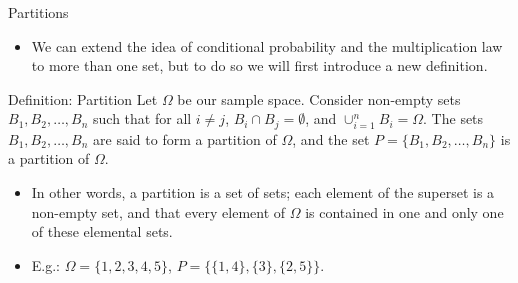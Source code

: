 \begin{frame}{Partitions}

  \begin{itemize}
    \item We can extend the idea of conditional probability and the multiplication law to more than one set, but to do so we will first introduce a new definition.
  \end{itemize}
  \begin{block}{Definition: Partition}
    Let $\Omega$ be our sample space. Consider non-empty sets $B_1, B_2, \ldots, B_n$ such that for all $i \neq j$, $B_i \cap B_j = \emptyset$, and $\cup_{i = 1}^n B_i = \Omega$. The sets $B_1, B_2, \ldots, B_n$ are said to form a partition of $\Omega$, and the set $P = \{B_1, B_2, \ldots, B_n\}$ is a partition of $\Omega$.
  \end{block}
  \begin{itemize}
    \item In other words, a partition is a set of sets; each element of the superset is a non-empty set, and that every element of $\Omega$ is contained in one and only one of these elemental sets.
    \item E.g.: $\Omega = \{1, 2, 3, 4, 5\}$, $P = \big\{ \{1, 4\}, \{3\}, \{2, 5\} \big\}.$
  \end{itemize}
  
\end{frame}

